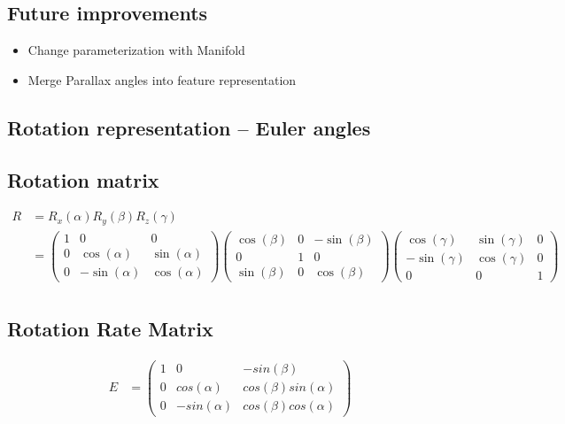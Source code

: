 \documentclass[12pt]{article}   %
\begin{document}
\subsection{Future improvements}
\begin{itemize}
	\item Change parameterization with Manifold \cite{Manifold2015}
	\item Merge Parallax angles into feature representation \cite{ParallaxBA2015}
\end{itemize}
\newpage 
\begin{appendices}
	\section{Rotation representation -- Euler angles}
	
	\subsection{Rotation matrix}
	\begin{align*}
		R &=R_{x}(\alpha) R_{y}(\beta) R_{z}(\gamma) \nonumber \\
		  &= \begin{pmatrix} 
				1 & 0 & 0 
				\\ 0 & \cos(\alpha) & \sin(\alpha) 
				\\ 0 & -\sin(\alpha) & \cos(\alpha) 
			\end{pmatrix} 
			\begin{pmatrix} 
				\cos(\beta) & 0 & -\sin(\beta) \\ 
				0 & 1 & 0 \\ 
				\sin(\beta) &  0 & \cos(\beta) 
			\end{pmatrix} 
			\begin{pmatrix} 
				\cos(\gamma) & \sin(\gamma) & 0 
				\\ -\sin(\gamma) & \cos(\gamma) &  0 
				\\ 0 & 0 & 1 
			\end{pmatrix} \\	
		\end{align*}
		
	\subsection{Rotation Rate Matrix}
	\begin{align*}
	E &= \begin{pmatrix} 
			1 & 0 & -sin(\beta) \\ 
			0 & cos(\alpha) & cos(\beta)sin(\alpha) \\ 
			0 & -sin(\alpha) & cos(\beta)cos(\alpha) 
		 \end{pmatrix} \\
	\end{align*}
	

\end{appendices}
\end{document}
